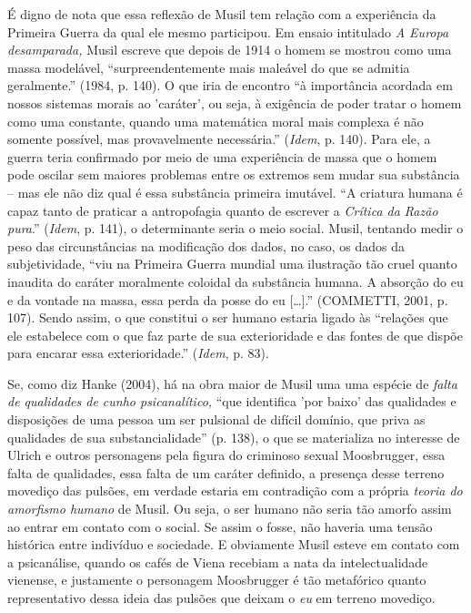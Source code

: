 É digno de nota que essa reflexão de Musil tem relação com a experiência
da Primeira Guerra da qual ele mesmo participou. Em ensaio intitulado
\emph{A Europa desamparada,} Musil escreve que depois de 1914 o homem se
mostrou como uma massa modelável, ``surpreendentemente mais maleável do
que se admitia geralmente.'' (1984, p. 140). O que iria de encontro ``à
importância acordada em nossos sistemas morais ao 'caráter', ou seja, à
exigência de poder tratar o homem como uma constante, quando uma
matemática moral mais complexa é não somente possível, mas provavelmente
necessária.'' (\emph{Idem}, p. 140). Para ele, a guerra teria confirmado
por meio de uma experiência de massa que o homem pode oscilar sem
maiores problemas entre os extremos sem mudar sua substância -- mas ele
não diz qual é essa substância primeira imutável. ``A criatura humana é
capaz tanto de praticar a antropofagia quanto de escrever a
\emph{Crítica da Razão pura}.'' (\emph{Idem}, p. 141), o determinante
seria o meio social. Musil, tentando medir o peso das circunstâncias na
modificação dos dados, no caso, os dados da subjetividade, ``viu na
Primeira Guerra mundial uma ilustração tão cruel quanto inaudita do
caráter moralmente coloidal da substância humana. A absorção do eu e da
vontade na massa, essa perda da posse do eu {[}\ldots{}{]}.'' (COMMETTI,
2001, p. 107). Sendo assim, o que constitui o ser humano estaria ligado
às ``relações que ele estabelece com o que faz parte de sua
exterioridade e das fontes de que dispõe para encarar essa
exterioridade.'' (\emph{Idem}, p. 83).

Se, como diz Hanke (2004), há na obra maior de Musil uma uma espécie de
\emph{falta de qualidades de cunho psicanalítico,} ``que identifica 'por
baixo' das qualidades e disposições de uma pessoa um ser pulsional de
difícil domínio, que priva as qualidades de sua substancialidade'' (p.
138), o que se materializa no interesse de Ulrich e outros personagens
pela figura do criminoso sexual Moosbrugger, essa falta de qualidades,
essa falta de um caráter definido, a presença desse terreno movediço das
pulsões, em verdade estaria em contradição com a própria \emph{teoria do
amorfismo humano} de Musil. Ou seja, o ser humano não seria tão amorfo
assim ao entrar em contato com o social. Se assim o fosse, não haveria
uma tensão histórica entre indivíduo e sociedade. E obviamente Musil
esteve em contato com a psicanálise, quando os cafés de Viena recebiam a
nata da intelectualidade vienense, e justamente o personagem Moosbrugger
é tão metafórico quanto representativo dessa ideia das pulsões que
deixam o \emph{eu} em terreno movediço.

